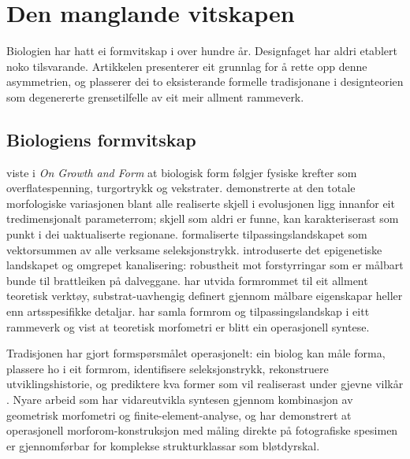 \documentclass[11pt,a4paper]{article}
\begin{document}
\section{Den manglande vitskapen}

Biologien har hatt ei formvitskap i over hundre år. Designfaget har aldri etablert noko tilsvarande. Artikkelen presenterer eit grunnlag for å rette opp denne asymmetrien, og plasserer dei to eksisterande formelle tradisjonane i designteorien som degenererte grensetilfelle av eit meir allment rammeverk.

\subsection{Biologiens formvitskap}

\citet{thompson1917} viste i \textit{On Growth and Form} at biologisk form følgjer fysiske krefter som overflatespenning, turgortrykk og vekstrater. \citet{raup1966} demonstrerte at den totale morfologiske variasjonen blant alle realiserte skjell i evolusjonen ligg innanfor eit tredimensjonalt parameterrom; skjell som aldri er funne, kan karakteriserast som punkt i dei uaktualiserte regionane. \citet{wright1932} formaliserte tilpassingslandskapet som vektorsummen av alle verksame seleksjonstrykk. \citet{waddington1957} introduserte det epigenetiske landskapet og omgrepet kanalisering: robustheit mot forstyrringar som er målbart bunde til brattleiken på dalveggane. \citet{mitteroecker2009} har utvida formrommet til eit allment teoretisk verktøy, substrat-uavhengig definert gjennom målbare eigenskapar heller enn artsspesifikke detaljar. \citet{mcghee2007} har samla formrom og tilpassingslandskap i eitt rammeverk og vist at teoretisk morfometri er blitt ein operasjonell syntese.

Tradisjonen har gjort formspørsmålet operasjonelt: ein biolog kan måle forma, plassere ho i eit formrom, identifisere seleksjonstrykk, rekonstruere utviklingshistorie, og prediktere kva former som vil realiserast under gjevne vilkår \citep{arnold2001, wagner2005}. Nyare arbeid som \citet{polly2016} har vidareutvikla syntesen gjennom kombinasjon av geometrisk morfometri og finite-element-analyse, og \citet{contrerasfigueroa2023} har demonstrert at operasjonell morforom-konstruksjon med måling direkte på fotografiske spesimen er gjennomførbar for komplekse strukturklassar som bløtdyrskal.
\end{document}
